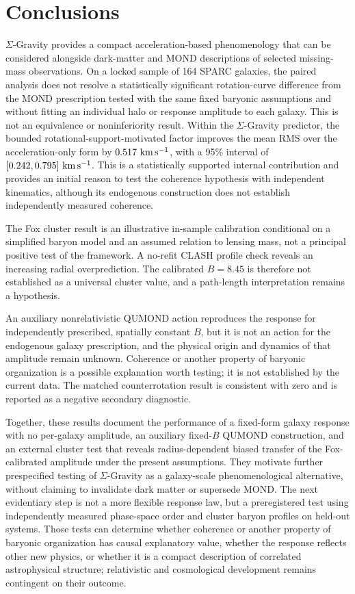 \documentclass[utf8]{FrontiersinHarvard}
\begin{document}
\section{Conclusions}\label{conclusions}

\(\Sigma\)-Gravity provides a compact acceleration-based phenomenology that can be considered alongside dark-matter and MOND descriptions of selected missing-mass observations. On a locked sample of 164 SPARC galaxies, the paired analysis does not resolve a statistically significant rotation-curve difference from the MOND prescription tested with the same fixed baryonic assumptions and without fitting an individual halo or response amplitude to each galaxy. This is not an equivalence or noninferiority result. Within the \(\Sigma\)-Gravity predictor, the bounded rotational-support-motivated factor improves the mean RMS over the acceleration-only form by \(0.517\ {\rm km\,s^{-1}}\), with a 95\% interval of \([0.242,0.795]\ {\rm km\,s^{-1}}\). This is a statistically supported internal contribution and provides an initial reason to test the coherence hypothesis with independent kinematics, although its endogenous construction does not establish independently measured coherence.

The Fox cluster result is an illustrative in-sample calibration conditional on a simplified baryon model and an assumed relation to lensing mass, not a principal positive test of the framework. A no-refit CLASH profile check reveals an increasing radial overprediction. The calibrated \(B=8.45\) is therefore not established as a universal cluster value, and a path-length interpretation remains a hypothesis.

An auxiliary nonrelativistic QUMOND action reproduces the response for independently prescribed, spatially constant \(B\), but it is not an action for the endogenous galaxy prescription, and the physical origin and dynamics of that amplitude remain unknown. Coherence or another property of baryonic organization is a possible explanation worth testing; it is not established by the current data. The matched counterrotation result is consistent with zero and is reported as a negative secondary diagnostic.

Together, these results document the performance of a fixed-form galaxy response with no per-galaxy amplitude, an auxiliary fixed-\(B\) QUMOND construction, and an external cluster test that reveals radius-dependent biased transfer of the Fox-calibrated amplitude under the present assumptions. They motivate further prespecified testing of \(\Sigma\)-Gravity as a galaxy-scale phenomenological alternative, without claiming to invalidate dark matter or supersede MOND. The next evidentiary step is not a more flexible response law, but a preregistered test using independently measured phase-space order and cluster baryon profiles on held-out systems. Those tests can determine whether coherence or another property of baryonic organization has causal explanatory value, whether the response reflects other new physics, or whether it is a compact description of correlated astrophysical structure; relativistic and cosmological development remains contingent on their outcome.
\end{document}
